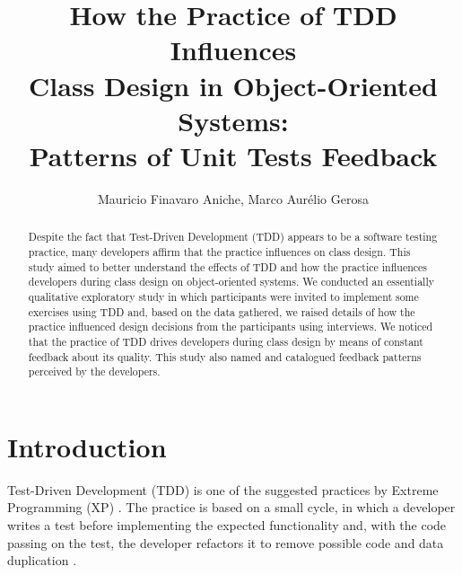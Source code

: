 \documentclass[times]{elsarticle}
\begin{document}
\title{How the Practice of TDD Influences \\Class Design in Object-Oriented Systems: \\Patterns of Unit Tests Feedback}

\author{Mauricio Finavaro Aniche, Marco Aurélio Gerosa}

\address{
	Department of Computer Sciences\\ 
	Institute of Mathematics and Statistics\\ 
	University of São Paulo (USP)\\ 
	PO Box 66.281 - 05.508-090 - São Paulo - SP - Brazil\\
}

\begin{abstract}

	Despite the fact that Test-Driven Development (TDD) appears to be a software testing practice, 
	many developers affirm that the practice influences on class design. This study aimed
	to better understand the effects of TDD and how the practice influences developers
	during class design on object-oriented systems. 
	We conducted an essentially qualitative exploratory study in which participants
	were invited to implement some exercises using TDD and, based on the data gathered,
	we raised details of how the practice influenced design decisions from the
	participants using interviews.
	We noticed that the practice of TDD drives
	developers during class design by means of constant feedback about its quality. This study
	also named and catalogued feedback patterns perceived by the developers.
	
\end{abstract}

\maketitle

\section{Introduction}

Test-Driven Development (TDD) is one of the suggested practices
by Extreme Programming (XP) \cite{XPExplained}. The practice is based on
a small cycle, in which a developer writes a test before implementing
the expected functionality and, with the code passing on the
test, the developer refactors it to remove possible code 
and data duplication \cite{TDDByExample}.
\end{document}
